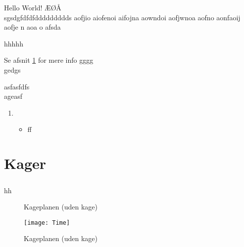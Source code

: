 \documentclass[]{article}
\begin{document}
\tableofcontents
Hello World!
ÆØÅ
\\
sgsdgfdfdfddddddddds \quad \qquad  aofjio aiofenoi aifojna aowndoi aofjwnoa aofno aonfaoij aofje n aoa o afsda

hhhhh

Se afsnit \ref{kk} for mere info
gggg
\\
gedgs
\raggedright
asfasfdfs \\
ageasf
\newpage

\begin{enumerate}
\item \begin{itemize}
\item ff
\end{itemize}
\end{enumerate}
\section{Kager} \label{kk}
\begin{align}
\end{align}
\newpage
hh
\begin{figure}
\caption{Kageplanen (uden kage)}
\texttt{[image: Time]}
\caption{Kageplanen (uden kage)}
\end{figure}
\end{document}
